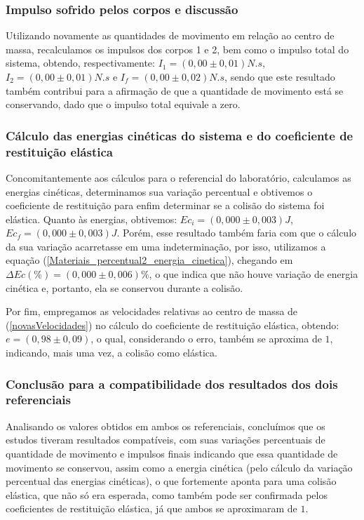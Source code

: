 \documentclass[12pt, twoside]{article}
\begin{document}
\subsubsection{Impulso sofrido pelos corpos e discussão}

    Utilizando novamente as quantidades de movimento em relação ao centro de massa, recalculamos os impulsos dos corpos 1 e 2, bem como o impulso total do sistema, obtendo, respectivamente: $I_1 = (0,00 \pm 0,01)N.s$,  $I_2 = (0,00 \pm 0,01)N.s$ e $I_f = (0,00 \pm 0,02)N.s$, sendo que este resultado também contribui para a afirmação de que a quantidade de movimento está se conservando, dado que o impulso total equivale a zero.

\subsubsection{Cálculo das energias cinéticas do sistema e do coeficiente de restituição elástica}

    Concomitantemente aos cálculos para o referencial do laboratório, calculamos as energias cinéticas, determinamos sua variação percentual e obtivemos o coeficiente de restituição para enfim determinar se a colisão do sistema foi elástica.
    Quanto às energias, obtivemos: $Ec_{i} = (0,000 \pm 0,003)J$, $Ec_{f} = (0,000 \pm 0,003)J$. Porém, esse resultado também faria com que o cálculo da sua variação acarretasse em uma indeterminação, por isso, utilizamos a equação (\ref{Materiais_percentual2_energia_cinetica}), chegando em $\Delta Ec(\%) = (0,000 \pm 0,006)\%$, o que indica que não houve variação de energia cinética e, portanto, ela se conservou durante a colisão.

    Por fim, empregamos as velocidades relativas ao centro de massa de (\ref{novasVelocidades}) no cálculo do coeficiente de restituição elástica, obtendo: $e = (0,98 \pm 0,09)$, o qual, considerando o erro, também se aproxima de $1$, indicando, mais uma vez, a colisão como elástica.

\subsubsection{Conclusão para a compatibilidade dos resultados dos dois referenciais}

    Analisando os valores obtidos em ambos os referenciais, concluímos que os estudos tiveram resultados compatíveis, com suas variações percentuais de quantidade de movimento e impulsos finais indicando que essa quantidade de movimento se conservou, assim como a energia cinética (pelo cálculo da variação percentual das energias cinéticas), o que fortemente aponta para uma colisão elástica, que não só era esperada, como também pode ser confirmada pelos coeficientes de restituição elástica, já que ambos se aproximaram de $1$.
\end{document}
